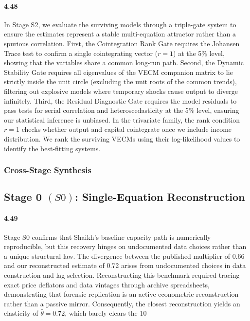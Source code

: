 \paragraph{4.48}
In Stage S2, we evaluate the surviving models through a triple-gate system to ensure the estimates represent a stable multi-equation attractor rather than a spurious correlation. First, the Cointegration Rank Gate requires the Johansen Trace test to confirm a single cointegrating vector ($r=1$) at the 5\% level, showing that the variables share a common long-run path. Second, the Dynamic Stability Gate requires all eigenvalues of the VECM companion matrix to lie strictly inside the unit circle (excluding the unit roots of the common trends), filtering out explosive models where temporary shocks cause output to diverge infinitely. Third, the Residual Diagnostic Gate requires the model residuals to pass tests for serial correlation and heteroscedasticity at the 5\% level, ensuring our statistical inference is unbiased. In the trivariate family, the rank condition $r=1$ checks whether output and capital cointegrate once we include income distribution. We rank the surviving VECMs using their log-likelihood values to identify the best-fitting systems.

\subsubsection{Cross-Stage Synthesis}
\label{subsec:cross_stage_synthesis_design}

\subsection{Stage 0 \texorpdfstring{$(S0)$}{}: Single-Equation Reconstruction}
\label{subsec:S0_reproducibility_new}

\paragraph{4.49}
Stage S0 confirms that Shaikh’s baseline capacity path is numerically reproducible, but this recovery hinges on undocumented data choices rather than a unique structural law. The divergence between the published multiplier of 0.66 and our reconstructed estimate of 0.72 arises from undocumented choices in data construction and lag selection. Reconstructing this benchmark required tracing exact price deflators and data vintages through archive spreadsheets, demonstrating that forensic replication is an active econometric reconstruction rather than a passive mirror. Consequently, the closest reconstruction yields an elasticity of $\hat{\theta} = 0.72$, which barely clears the 10%

